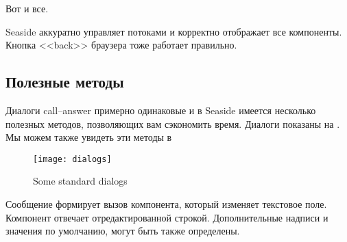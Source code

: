 \documentclass[a4paper,10pt,twoside]{book}
\begin{document}

Вот и все.


Seaside аккуратно управляет потоками и корректно отображает все
компоненты. Кнопка <<back>> браузера тоже работает правильно.


\subsection{Полезные методы}


Диалоги call--answer примерно одинаковые и в Seaside имеется несколько
полезных методов, позволяющих вам сэкономить время.
Диалоги показаны на .
Мы можем также увидеть эти методы в

\begin{figure}[b]
\begin{center}
\texttt{[image: dialogs]}
\caption{Some standard dialogs}
\end{center}
\end{figure}


Сообщение  формирует вызов
компонента, который изменяет текстовое поле.
Компонент отвечает отредактированной строкой.
Дополнительные надписи и значения по умолчанию,
могут быть также определены.
\end{document}
